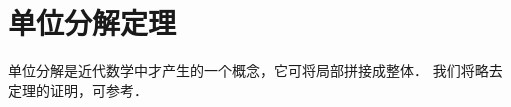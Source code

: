 

\section{单位分解定理}\label{chdf:sec_partition-unity}
单位分解是近代数学中才产生的一个概念，它可将局部拼接成整体．
我们将略去定理的证明，可参考\textcite[\S 3.3]{cc2001-zh}．

